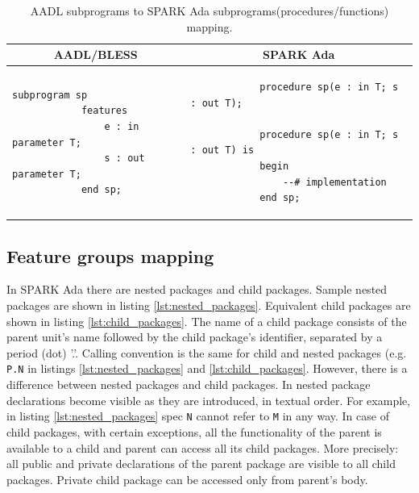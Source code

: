 \singlespacing
\begin{table}[!ht]
	\caption{AADL subprograms to SPARK Ada subprograms(procedures/functions) mapping.}
	\label{table:subprograms_mapping}
	\centering
  	\begin{tabular}{ | p{3in} | p{3in} |}

		\hline
		\multicolumn{1}{|c|}{\textbf{AADL/BLESS}} & \multicolumn{1}{|c|}{\textbf{SPARK Ada}} \\ \hline

		\begin{lstlisting}[language=aadl]
			subprogram sp
			features
				e : in parameter T;
				s : out parameter T;
			end sp;
		\end{lstlisting} 
		& 
		\begin{lstlisting}
			procedure sp(e : in T; s : out T);

			procedure sp(e : in T; s : out T) is 
			begin
				--# implementation
			end sp;
		\end{lstlisting} 		

		\\ \hline
	\end{tabular}
\end{table}
\doublespacing


\subsection{Feature groups mapping}
\label{codegen:mapping:feature_groups}

In SPARK Ada there are nested packages and child packages. Sample nested packages are shown in listing \ref{lst:nested_packages}. Equivalent child packages are shown in listing \ref{lst:child_packages}. The name of a child package consists of the parent unit's name followed by the child package's identifier, separated by a period (dot) '.'. Calling convention is the same for child and nested packages (e.g. \lstinline{P.N} in listings \ref{lst:nested_packages} and \ref{lst:child_packages}. However, there is a difference between nested packages and child packages. In nested package declarations become visible as they are introduced, in textual order. For example, in listing \ref{lst:nested_packages} spec \lstinline{N} cannot refer to \lstinline{M} in any way. In case of child packages, with certain exceptions, all the functionality of the parent is available to a child and parent can access all its child packages. More precisely: all public and private declarations of the parent package are visible to all child packages. Private child package can be accessed only from parent's body.

